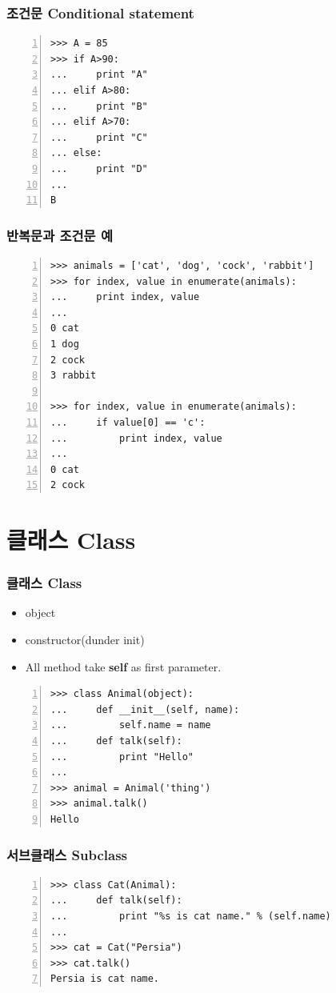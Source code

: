 \documentclass[10pt]{beamer}
\begin{document}
\begin{frame}[fragile]
\frametitle{조건문 Conditional statement}
\begin{Verbatim}[numbers=left]
>>> A = 85
>>> if A>90:
...     print "A"
... elif A>80:
...     print "B"
... elif A>70:
...     print "C"
... else:
...     print "D"
...
B
\end{Verbatim}
\end{frame}

\begin{frame}[fragile]
\frametitle{반복문과 조건문 예}
\begin{Verbatim}[numbers=left]
>>> animals = ['cat', 'dog', 'cock', 'rabbit']
>>> for index, value in enumerate(animals):
...     print index, value
...
0 cat
1 dog
2 cock
3 rabbit

>>> for index, value in enumerate(animals):
...     if value[0] == 'c':
...         print index, value
...
0 cat
2 cock
\end{Verbatim}
\end{frame}

\section{클래스 Class}
\begin{frame}[fragile]
\frametitle{클래스 Class}
\begin{itemize}
	\item object
	\item constructor(dunder init)
	\item All method take \textbf{self} as first parameter.
\end{itemize}
\vspace{2mm}
\begin{Verbatim}[numbers=left,commandchars=\\\{\}]
>>> class Animal(object):
...     def __init__(self, name):
...         self.name = name
...     def talk(self):
...         print "Hello"
...
>>> animal = Animal('thing')
>>> animal.talk()
Hello
\end{Verbatim}
\end{frame}

\begin{frame}[fragile]
\frametitle{서브클래스 Subclass}
\begin{Verbatim}[numbers=left,commandchars=\\\{\}]
>>> class Cat(Animal):
...     def talk(self):
...         print "%s is cat name." % (self.name)
...
>>> cat = Cat("Persia")
>>> cat.talk()
Persia is cat name.
\end{Verbatim}
\end{frame}
\end{document}
